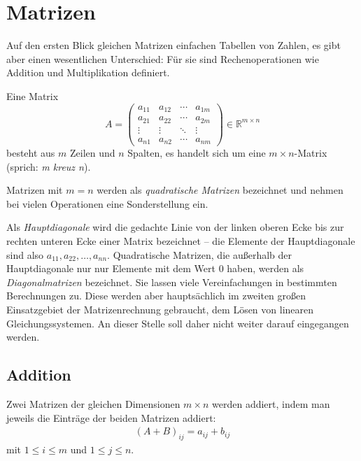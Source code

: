 

\section{Matrizen}
Auf den ersten Blick gleichen Matrizen einfachen Tabellen von Zahlen, es gibt aber einen wesentlichen Unterschied: Für sie sind Rechenoperationen wie Addition und Multiplikation definiert.

Eine Matrix
\begin{equation}
 A = \begin{pmatrix}
   a_{11} & a_{12} & \cdots & a_{1m}\\
   a_{21} & a_{22} & \cdots & a_{2m}\\
   \vdots & \vdots & \ddots & \vdots\\
   a_{n1} & a_{n2} & \cdots & a_{nm}
 \end{pmatrix}
 \in \mathbb{R}^{m \times n}
\end{equation}
besteht aus $m$ Zeilen und $n$ Spalten, es handelt sich um eine $m \times n$-Matrix (sprich: \emph{m kreuz n}).

Matrizen mit $m = n$ werden als \emph{quadratische Matrizen} bezeichnet und nehmen bei vielen Operationen eine Sonderstellung ein.

Als \emph{Hauptdiagonale} wird die gedachte Linie von der linken oberen Ecke bis zur rechten unteren Ecke einer Matrix bezeichnet -- die Elemente der Hauptdiagonale sind also $a_{11}, a_{22}, \ldots, a_{nn}$. Quadratische Matrizen, die außerhalb der Hauptdiagonale nur nur Elemente mit dem Wert 0 haben, werden als \emph{Diagonalmatrizen} bezeichnet. Sie lassen viele Vereinfachungen in bestimmten Berechnungen zu. Diese werden aber hauptsächlich im zweiten großen Einsatzgebiet der Matrizenrechnung gebraucht, dem Lösen von linearen Gleichungssystemen. An dieser Stelle soll daher nicht weiter darauf eingegangen werden.


\subsection{Addition}
Zwei Matrizen der gleichen Dimensionen $m \times n$ werden addiert, indem man jeweils die Einträge der beiden Matrizen addiert:
\begin{align}
 (A + B)_{ij} = a_{ij} + b_{ij}%
\end{align}
mit $1 \leq i \leq m$ und $1 \leq j \leq n$.

